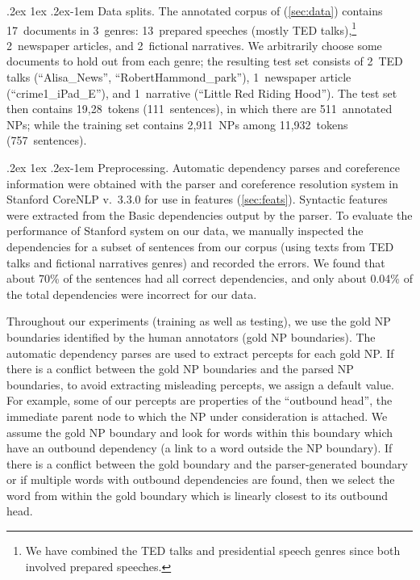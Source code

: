 \documentclass[11pt,letterpaper]{article}
\makeatletter
\renewcommand{\paragraph}{%
  \@startsection{paragraph}{4}%
  {\z@}{.2ex \@plus 1ex \@minus .2ex}{-1em}%
  {\normalfont\normalsize\bfseries}%
}
\makeatother
\begin{document}
\paragraph{Data splits.} The annotated corpus of \citet{bhatia14} (\cref{sec:data}) contains 17~documents 
in 3~genres: 13~prepared speeches (mostly TED talks),\footnote{We have combined the TED talks and presidential speech genres since both involved prepared speeches.} 2~newspaper articles, 
and 2~fictional narratives. We arbitrarily choose some documents to hold out from each genre; 
the resulting test set consists of 2~TED talks (``Alisa\_News'', ``RobertHammond\_park''), 
1~newspaper article (``crime1\_iPad\_E''), and 1~narrative (``Little Red Riding Hood'').
The test set then contains 19,28~tokens (111~sentences), in which there are 511~annotated NPs; 
while the training set contains 2,911~NPs among 11,932~tokens (757~sentences).

\paragraph{Preprocessing.} Automatic dependency parses and coreference information were obtained with 
the parser and coreference resolution system in Stanford CoreNLP v.~3.3.0 \citep{socher-13,recasens-13}
for use in features (\cref{sec:feats}). Syntactic features were extracted from the Basic dependencies output by the parser. 
To evaluate the performance of Stanford system on our data, 
we manually inspected the dependencies for a subset of sentences from our corpus (using texts from TED talks and fictional narratives genres) 
and recorded the errors. 
We found that about 70\% of the sentences had all correct dependencies, and only about 0.04\% of the total dependencies were incorrect for our data.

Throughout our experiments (training as well as testing), we use the gold NP boundaries identified by the human annotators (gold NP boundaries).
The automatic dependency parses are used to extract percepts for each gold NP.     
If there is a conflict between the gold NP boundaries and the parsed NP boundaries, to avoid extracting misleading percepts, 
we assign a default value.  
For example, some of our percepts are properties of the ``outbound head'', the immediate parent node to which the NP under consideration is attached.
We assume the gold NP boundary and look for words within this boundary which have an outbound dependency (a link to a word outside the NP boundary).    
If there is a conflict between the gold boundary  and the parser-generated boundary or if multiple words with outbound dependencies are found, then
we select the word from within the gold boundary which is linearly closest to its outbound head.
\end{document}
